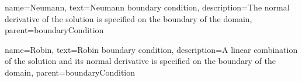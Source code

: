 %
{%
	name={Neumann},
	text={Neumann boundary condition},
	description={The normal derivative of the solution is specified on the boundary of the domain},
	parent={boundaryCondition}
}

%
{%
	name={Robin}, 
	text={Robin boundary condition},
	description={A linear combination of the solution and its normal derivative is specified on the boundary of the domain},
	parent={boundaryCondition}
}

  